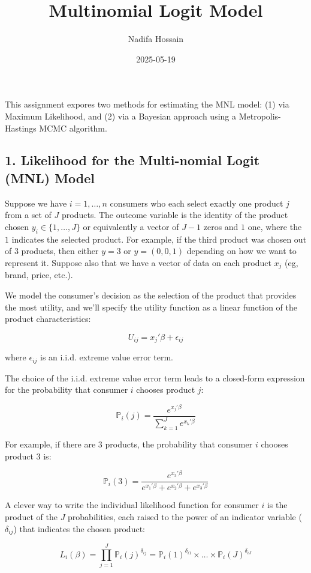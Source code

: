 \documentclass[
  letterpaper,
  DIV=11,
  numbers=noendperiod]{scrartcl}
\title{Multinomial Logit Model}
\author{Nadifa Hossain}
\date{2025-05-19}
\begin{document}
\maketitle


This assignment expores two methods for estimating the MNL model: (1)
via Maximum Likelihood, and (2) via a Bayesian approach using a
Metropolis-Hastings MCMC algorithm.

\subsection{1. Likelihood for the Multi-nomial Logit (MNL)
Model}\label{likelihood-for-the-multi-nomial-logit-mnl-model}

Suppose we have \(i=1,\ldots,n\) consumers who each select exactly one
product \(j\) from a set of \(J\) products. The outcome variable is the
identity of the product chosen \(y_i \in \{1, \ldots, J\}\) or
equivalently a vector of \(J-1\) zeros and \(1\) one, where the \(1\)
indicates the selected product. For example, if the third product was
chosen out of 3 products, then either \(y=3\) or \(y=(0,0,1)\) depending
on how we want to represent it. Suppose also that we have a vector of
data on each product \(x_j\) (eg, brand, price, etc.).

We model the consumer's decision as the selection of the product that
provides the most utility, and we'll specify the utility function as a
linear function of the product characteristics:

\[ U_{ij} = x_j'\beta + \epsilon_{ij} \]

where \(\epsilon_{ij}\) is an i.i.d. extreme value error term.

The choice of the i.i.d. extreme value error term leads to a closed-form
expression for the probability that consumer \(i\) chooses product
\(j\):

\[ \mathbb{P}_i(j) = \frac{e^{x_j'\beta}}{\sum_{k=1}^Je^{x_k'\beta}} \]

For example, if there are 3 products, the probability that consumer
\(i\) chooses product 3 is:

\[ \mathbb{P}_i(3) = \frac{e^{x_3'\beta}}{e^{x_1'\beta} + e^{x_2'\beta} + e^{x_3'\beta}} \]

A clever way to write the individual likelihood function for consumer
\(i\) is the product of the \(J\) probabilities, each raised to the
power of an indicator variable (\(\delta_{ij}\)) that indicates the
chosen product:

\[ L_i(\beta) = \prod_{j=1}^J \mathbb{P}_i(j)^{\delta_{ij}} = \mathbb{P}_i(1)^{\delta_{i1}} \times \ldots \times \mathbb{P}_i(J)^{\delta_{iJ}}\]
\end{document}
